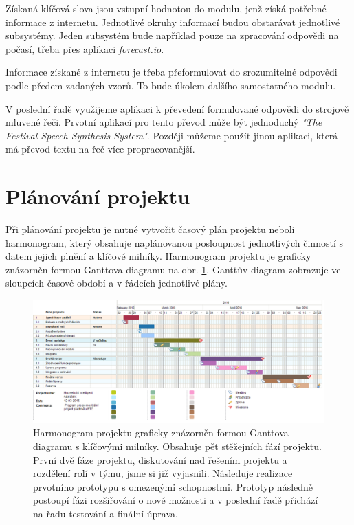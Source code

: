 \documentclass[12pt,a4paper]{article}
\begin{document}
Získaná klíčová slova jsou vstupní hodnotou do modulu, jenž získá potřebné informace z internetu. Jednotlivé okruhy informací budou obstarávat jednotlivé subsystémy. Jeden subsystém bude například pouze na zpracování odpovědi na počasí, třeba přes aplikaci \textit{forecast.io}.

Informace získané z internetu je třeba přeformulovat do srozumitelné odpovědi podle předem zadaných vzorů. To bude úkolem dalšího samostatného modulu.

V poslední řadě využijeme aplikaci k převedení formulované odpovědi do strojově mluvené řeči. Prvotní aplikací pro tento převod může být jednoduchý \textit{"The Festival Speech Synthesis System"}. Později můžeme použít jinou aplikaci, která má převod textu na řeč více propracovanější.


\section*{Plánování projektu}
Při plánování projektu je nutné vytvořit časový plán projektu neboli harmonogram, který obsahuje naplánovanou posloupnost jednotlivých činností s datem jejich plnění a klíčové milníky. Harmonogram projektu je graficky znázorněn formou Ganttova diagramu na obr. \ref{fig:diagram gantt}. Ganttův diagram zobrazuje ve sloupcích časové období a v řádcích jednotlivé plány. 

\begin{landscape}
\begin{figure}[ht]
	\begin{center}
	\includegraphics[height = 0.6\textheight ]{PTO-Gantt.png}
	\caption{Harmonogram projektu graficky znázorněn formou Ganttova diagramu s klíčovými milníky. Obsahuje pět stěžejních fází projektu. 
První dvě fáze projektu, diskutování nad řešením projektu a rozdělení rolí v týmu, jsme si již vyjasnili. Následuje realizace prvotního prototypu s omezenými schopnostmi. Prototyp následně postoupí fázi rozšiřování o nové možnosti a v poslední řadě přichází na řadu testování a finální úprava.}
	\label{fig:diagram gantt}
	\end{center}
\end{figure}
\end{landscape}
\end{document}
